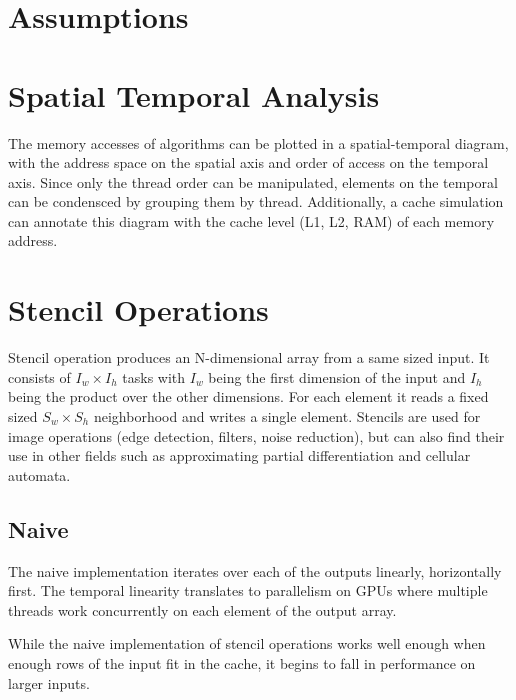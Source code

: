 
\section{Assumptions}

\section{Spatial Temporal Analysis}
The memory accesses of algorithms can be plotted in a spatial-temporal diagram, with the address space on the spatial axis and order of access on the temporal axis.
Since only the thread order can be manipulated, elements on the temporal can be condensced by grouping them by thread.
Additionally, a cache simulation can annotate this diagram with the cache level (L1, L2, RAM) of each memory address.


\section{Stencil Operations}

Stencil operation produces an N-dimensional array from a same sized input.
It consists of $I_w \times I_h$ tasks with $I_w$ being the first dimension of the input and $I_h$ being the product over the other dimensions.
For each element it reads a fixed sized $S_w \times S_h$ neighborhood and writes a single element.
Stencils are used for image operations (edge detection, filters, noise reduction), but can also find their use in other fields such as approximating partial differentiation\cite{roth1997compilingstencils} and cellular automata.

\subsection{Naive}
\label{sec:stencil_naive}
The naive implementation iterates over each of the outputs linearly, horizontally first.
The temporal linearity translates to parallelism on GPUs where multiple threads work concurrently on each element of the output array.

While the naive implementation of stencil operations works well enough when enough rows of the input fit in the cache, it begins to fall in performance on larger inputs.


